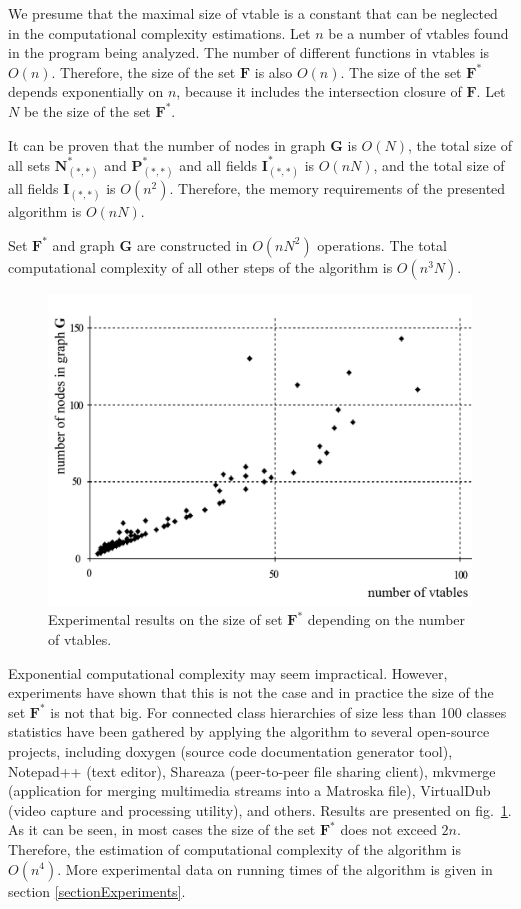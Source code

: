 \documentclass[10pt, conference]{IEEEtran}
\newcommand{\ib}[1]{\textbf{#1}}
\newcommand{\gF}{\ib{F}}
\newcommand{\gG}{\ib{G}}
\newcommand{\gI}{\ib{I}}
\newcommand{\gN}{\ib{N}}
\newcommand{\gP}{\ib{P}}
\newcommand{\gFs}{\gF^*}
\begin{document}
We presume that the maximal size of vtable is a constant that can be neglected in
the computational complexity estimations.
Let $n$ be a number of vtables found in the program being analyzed.
The number of different functions in vtables is $O(n)$. Therefore,
the size of the set $\gF$ is also $O(n)$. The size of the set $\gFs$ depends
exponentially on $n$, because it includes the intersection closure of $\gF$.
Let $N$ be the size of the set $\gFs$.

It can be proven that the number of nodes in graph $\gG$ is
$O(N)$, the total size of all sets $\gN^{*}_{(*, *)}$ and $\gP^{*}_{(*, *)}$ and all fields
$\gI^{*}_{(*, *)}$ is $O(nN)$, and the total size of all fields $\gI_{(*, *)}$
is $O(n^2)$. Therefore, the memory requirements of the presented algorithm is
$O(nN)$.

Set $\gFs$ and graph $\gG$ are constructed in $O(nN^2)$ operations.
The total computational complexity of all other steps of the algorithm
is $O(n^3N)$.

\begin{figure}[tb!]
\centering
  \includegraphics[scale=0.22]{images/fstar_size}
\caption{Experimental results on the size of set $\gFs$ depending on the number of vtables.}
\label{fig:fstar_size}
\end{figure}


Exponential computational complexity may seem impractical.
However, experiments have shown that this is not the case and in
practice the size of the set $\gFs$ is not that big.
For connected class hierarchies of size less than 100 classes statistics have
been gathered by applying the algorithm to several open-source
projects, including doxygen (source code documentation generator tool),
Notepad++ (text editor), Shareaza (peer-to-peer file sharing client),
mkvmerge (application for merging multimedia streams into a Matroska file),
VirtualDub (video capture and processing utility), and others.
Results are presented on fig.~\ref{fig:fstar_size}. As it can
be seen, in most cases the size of the set $\gFs$ does not exceed $2n$.
Therefore, the estimation of computational complexity of the
algorithm is $O(n^4)$.
More experimental data on running times of the algorithm is
given in section \ref{sectionExperiments}.
\end{document}
